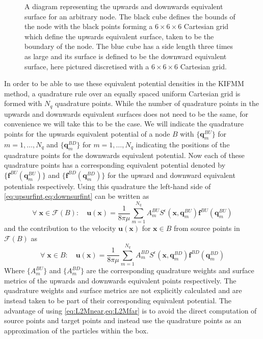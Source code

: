 \begin{figure}[ht]
    \centering
    \resizebox{.6\linewidth}{!}{}
    \caption[A diagram representing the upwards and downwards equivalent surface for an arbitrary node]{A diagram representing the upwards and downwards equivalent surface for an arbitrary node. The black cube defines the bounds of the node with the black points forming a $6 \times 6 \times 6$ Cartesian grid which define the upwards equivalent surface, taken to be the boundary of the node. The blue cube has a side length three times as large and its surface is defined to be the downward equivalent surface, here pictured discretised with a $6 \times 6 \times 6$ Cartesian grid.}
    \label{fig:UpandDownsurf}
\end{figure}

In order to be able to use these equivalent potential densities in the KIFMM method, a quadrature rule over an equally spaced uniform Cartesian grid is formed with $N_q$ quadrature points. While the number of quadrature points in the upwards and downwards equivalent surfaces does not need to be the same, for convenience we will take this to be the case. We will indicate the quadrature points for the upwards equivalent potential of a node $B$ with $\{\bm{q}^{BU}_m\}$ for $m=1,\dots,N_q$ and $\{\bm{q}^{BD}_m\}$ for $m=1,\dots,N_q$ indicating the positions of the quadrature points for the downwards equivalent potential. Now each of these quadrature points has a corresponding equivalent potential denoted by $\{\bm{f}^{BU}(\bm{q}^{BU}_m)\}$ and $\{\bm{f}^{BD}(\bm{q}^{BD}_m)\}$ for the upward and downward equivalent potentials respectively. Using this quadrature the left-hand side of \cref{eq:upsurfint,eq:downsurfint} can be written as 
\begin{equation}
\label{eq:L2Mfar}
    \forall \;\bm{x} \in \mathcal{F}(B): \quad \bm{u}(\bm{x})= \frac{1}{8 \pi \mu} \sum_{m=1}^{N_{q}} A_{m}^{BU} S^\epsilon\left(\bm{x}, \bm{q}_{m}^{B U}\right) \bm{f}^{B U}\left(\bm{q}_{m}^{B U}\right)
\end{equation}
and the contribution to the velocity $\bm{u}(\bm{x})$ for $\bm{x} \in B$ from source points in $\mathcal{F}(B)$ as
\begin{equation}
\label{eq:L2Mnear}
    \forall \;\bm{x} \in B: \quad \bm{u}(\bm{x})= \frac{1}{8 \pi \mu} \sum_{m=1}^{N_{q}} A_{m}^{BD} S^\epsilon\left(\bm{x}, \bm{q}_{m}^{B D}\right) \bm{f}^{B D}\left(\bm{q}_{m}^{B D}\right)
\end{equation}
Where $\{A_{m}^{BU}\}$ and $\{A_{m}^{BD}\}$ are the corresponding quadrature weights and surface metrics of the upwards and downwards equivalent points respectively. The quadrature weights and surface metrics are not explicitly calculated and are instead taken to be part of their corresponding equivalent potential. The advantage of using \cref{eq:L2Mnear,eq:L2Mfar} is to avoid the direct computation of source points and target points and instead use the quadrature points as an approximation of the particles within the box.

